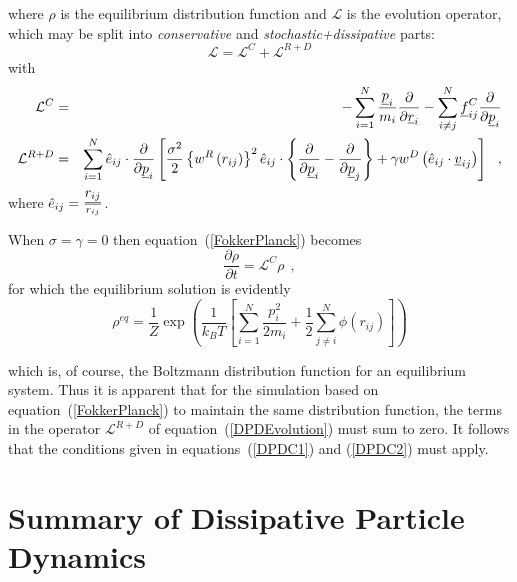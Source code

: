 where $\rho$ is the equilibrium distribution function and $\mathcal{L}$ is the evolution
operator, which may be split into \emph{conservative} and \emph{stochastic+dissipative} parts:
\begin{equation}
\mathcal{L} = \mathcal{L}^{C} + \mathcal{L}^{R+D}
\end{equation}
with
\begin{eqnarray}
\mathcal{L}^{C} &=& -\sum_{i=1}^{N} \frac{\mbox{$\underline{p}$}_{i}}{m_{i}}
\frac{\partial}{\partial \mbox{$\underline{r}$}_{i}} - \sum_{i \neq j}^{N}
\mbox{$\underline{f}$}_{ij}^{C} \frac{\partial}{\partial \mbox{$\underline{p}$}_{i}} \\
\mathcal{L}^{R+D} &=& \sum_{i=1}^{N} \hat{e}_{ij} \cdot \frac{\partial}{\partial \mbox{$\underline{p}$}_{i}}
\left[ \frac{\sigma^{2}}{2} \left\{w^{R} \left(r_{ij} \right) \right\}^{2} \hat{e}_{ij} \cdot
\left\{ \frac{\partial}{\partial \mbox{$\underline{p}$}_{i}} - \frac{\partial}{\partial \mbox{$\underline{p}$}_{j}} \right\} +
\gamma w^{D} \left( \hat{e}_{ij} \cdot \mbox{$\underline{v}$}_{ij} \right) \right]~~, \label {DPDEvolution}
\end{eqnarray}
where $\hat{e}_{ij} = \frac{\mbox{$\underline{r_{ij}}$}}{r_{ij}}$.

When $\sigma = \gamma = 0$ then equation~(\ref{FokkerPlanck}) becomes
\begin{equation}
\frac{\partial \rho}{\partial t} = \mathcal{L}^{C} \rho~~,
\end{equation}
for which the equilibrium solution is evidently
\begin{equation}
\rho^{eq} = \frac{1}{Z} \exp \left( \frac{1}{k_{B} T} \left[ \sum_{i=1}^{N}
\frac{p_{i}^{2}}{2 m_{i}} + \frac{1}{2} \sum_{j \neq i}^{N} \phi (r_{ij}) \right] \right)
\end{equation}

which is, of course, the Boltzmann distribution function for an equilibrium system.
Thus it is apparent that for the simulation based on equation~(\ref{FokkerPlanck})
to maintain the same distribution function, the terms in the operator $\mathcal{L}^{R+D}$
of equation~(\ref{DPDEvolution}) must sum to zero.  It follows that the
conditions given in equations~(\ref{DPDC1}) and (\ref{DPDC2}) must apply.

\section{Summary of Dissipative Particle Dynamics}

